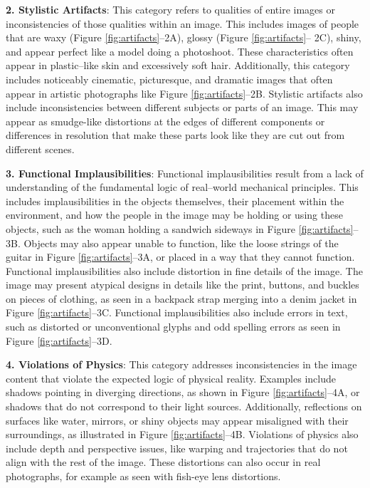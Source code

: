 \textbf{2. Stylistic Artifacts}: This category refers to qualities of entire images or inconsistencies of those qualities within an image. This includes images of people that are waxy (Figure \ref{fig:artifacts}--2A), glossy (Figure \ref{fig:artifacts}-- 2C), shiny, and appear perfect like a model doing a photoshoot. These characteristics often appear in plastic--like skin and excessively soft hair. Additionally, this category includes noticeably cinematic, picturesque, and dramatic images that often appear in artistic photographs like Figure \ref{fig:artifacts}--2B. Stylistic artifacts also include inconsistencies between different subjects or parts of an image. This may appear as smudge-like distortions at the edges of different components or differences in resolution that make these parts look like they are cut out from different scenes.


\textbf{3. Functional Implausibilities}: Functional implausibilities result from a lack of understanding of the fundamental logic of real--world mechanical principles. This includes implausibilities in the objects themselves, their placement within the environment, and how the people in the image may be holding or using these objects, such as the woman holding a sandwich sideways in Figure \ref{fig:artifacts}--3B. Objects may also appear unable to function, like the loose strings of the guitar in Figure \ref{fig:artifacts}--3A, or placed in a way that they cannot function. Functional implausibilities also include distortion in fine details of the image. The image may present atypical designs in details like the print, buttons, and buckles on pieces of clothing, as seen in a backpack strap merging into a denim jacket in Figure \ref{fig:artifacts}--3C. Functional implausibilities also include errors in text, such as distorted or unconventional glyphs and odd spelling errors as seen in Figure \ref{fig:artifacts}--3D.

\textbf{4. Violations of Physics}: This category addresses inconsistencies in the image content that violate the expected logic of physical reality. Examples include shadows pointing in diverging directions, as shown in Figure \ref{fig:artifacts}--4A, or shadows that do not correspond to their light sources. Additionally, reflections on surfaces like water, mirrors, or shiny objects may appear misaligned with their surroundings, as illustrated in Figure \ref{fig:artifacts}--4B. Violations of physics also include depth and perspective issues, like warping and trajectories that do not align with the rest of the image. These distortions can also occur in real photographs, for example as seen with fish-eye lens distortions.


